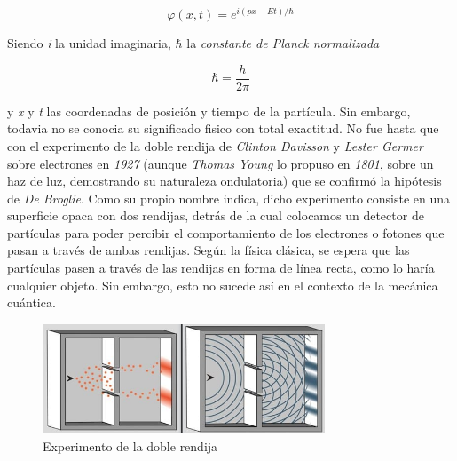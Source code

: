\documentclass{article}
\numberwithin{equation}{section} %
\begin{document}
        \vspace{5mm}

        \begin{equation}
            \varphi (x, t) = e^{i(px - Et) / \hbar}
            \label{eq: funcion_de_onda}
        \end{equation}

        \vspace{5mm}

        Siendo \textit{i} la unidad imaginaria, \( \hbar \) la \textit{constante de Planck normalizada}

        \vspace{5mm}

        \begin{equation}
            \hbar = \frac{h}{2\pi} 
            \label{constante_planck_normalizada}
        \end{equation}    

        \vspace{5mm}
        
        y \textit{x} y \textit{t} las coordenadas de posición y tiempo de la partícula. Sin embargo, todavia no se conocia su significado fisico con total exactitud. No fue hasta que con el experimento de la doble rendija de \textit{Clinton Davisson} y \textit{Lester Germer} sobre electrones en \textit{1927} (aunque \textit{Thomas Young} lo propuso en \textit{1801}, sobre un haz de luz, demostrando su naturaleza ondulatoria) que se confirmó la hipótesis de \textit{De Broglie}. Como su propio nombre indica, dicho experimento consiste en una superficie opaca con dos rendijas, detrás de la cual colocamos un detector de partículas para poder percibir el comportamiento de los electrones o fotones que pasan a través de ambas rendijas. Según la física clásica, se espera que las partículas pasen a través de las rendijas en forma de línea recta, como lo haría cualquier objeto. Sin embargo, esto no sucede así en el contexto de la mecánica cuántica.

        \vspace{5mm}

        \begin{figure}[h]
            \centering
            \includegraphics[width=0.75\textwidth]{img/Introduccion/doble_rendija.png}
            \caption{Experimento de la doble rendija}
            \label{fig: doble_rendija}
        \end{figure}
\end{document}
